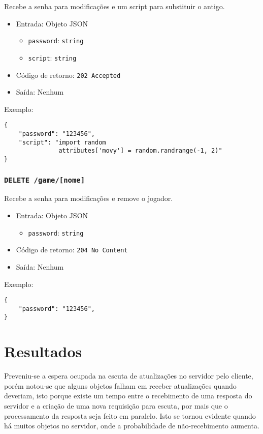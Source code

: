 \documentclass[12pt,a4paper]{article}
\begin{document}
Recebe a senha para modificações e um script para substituir o antigo.

\begin{itemize}
	\item Entrada: Objeto JSON
		\begin{itemize}
			\item \texttt{password}: \texttt{string}
			\item \texttt{script}: \texttt{string}
		\end{itemize}
	\item Código de retorno: \texttt{202 Accepted}
	\item Saída: Nenhum
\end{itemize}

Exemplo:

\begin{verbatim}
{
    "password": "123456",
    "script": "import random
               attributes['movy'] = random.randrange(-1, 2)"
}
\end{verbatim}

\subsubsection{\texttt{DELETE /game/[nome]}}

Recebe a senha para modificações e remove o jogador.

\begin{itemize}
	\item Entrada: Objeto JSON
		\begin{itemize}
			\item \texttt{password}: \texttt{string}
		\end{itemize}
	\item Código de retorno: \texttt{204 No Content}
	\item Saída: Nenhum
\end{itemize}

Exemplo:

\begin{verbatim}
{
    "password": "123456",
}
\end{verbatim}

\pagebreak \section{Resultados}

Preveniu-se a espera ocupada na escuta de atualizações no servidor pelo
cliente, porém notou-se que alguns objetos falham em receber atualizações
quando deveriam, isto porque existe um tempo entre o recebimento de uma
resposta do servidor e a criação de uma nova requisição para escuta, por mais
que o processamento da resposta seja feito em paralelo. Isto se tornou evidente
quando há muitos objetos no servidor, onde a probabilidade de não-recebimento
aumenta.
\end{document}
